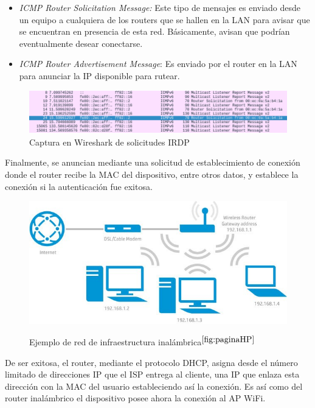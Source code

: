 \begin{itemize}
\item{\textit{ICMP Router Solicitation Message:} Este tipo de mensajes es enviado desde un equipo a cualquiera de los routers que se hallen en la LAN para avisar que se encuentran en presencia de esta red. Básicamente, avisan que podrían eventualmente desear conectarse.}
\item{\textit{ICMP Router Advertisement Message}: Es enviado por el router en la LAN para anunciar la IP disponible para rutear.}\\
\end{itemize}

\begin{figure}[h!]
\centering
\includegraphics[scale=0.5]{./imagenes/IRDP}
\caption{Captura en Wireshark de solicitudes IRDP}
\label{fig:IRDP}
\end{figure}

Finalmente, se anuncian mediante una solicitud de establecimiento de conexión donde el router recibe la MAC del dispositivo, entre otros datos, y establece la conexión si la autenticación fue exitosa.\\


\begin{figure}[h!]
\centering
		\includegraphics[scale=0.5]{./imagenes/ap}
		\label{fig:access_point}
		\caption{Ejemplo de red de infraestructura inalámbrica$^{\ref{fig:paginaHP}}$}
\end{figure}

De ser exitosa, el router, mediante el protocolo \ac{DHCP}, asigna desde el número limitado de direcciones IP que el \ac{ISP} entrega al cliente, una IP que enlaza esta dirección con la MAC del usuario estableciendo así la conexión. Es así como del router inalámbrico el dispositivo posee ahora la conexión al AP WiFi.

